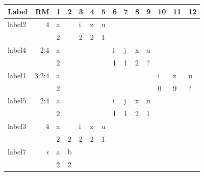 \documentclass{beamer}
\newcommand{\col}[1]{\textcolor{cdpurple}{#1}}
\begin{document}
\begin{frame}
	\begin{tabular}{|p{1cm}|r||R{0.25cm}|R{0.25cm}|R{0.25cm}|R{0.25cm}|R{0.25cm}|R{0.25cm}|R{0.25cm}|R{0.25cm}|R{0.25cm}|R{0.25cm}|R{0.25cm}|R{0.25cm}|}
		\hline
		Label & RM & 1 & 2 & 3 & 4 & 5 & 6 & 7 & 8 & 9 & 10 & 11 & 12 \\ 
		\hline \hline
		label2 & 4          & a &   & i       & z   & u &   &   &   &   &   &   & \\ 
		       &            & 2 &   & 2       & 2   & 1 &   &   &   &   &   &   & \\ \hline
		label4 & 2:4        & a &   &         &     &   & i & j & x & u &   &   & \\ 
		       &            & 2 &   &         &     &   & 1 & 1 & 2 & ? &   &   & \\ \hline
		label1 & 3:2:4      & a &   &         &     &   &   &   &   &   & i & z & u \\ 
		       &            & 2 &   &         &     &   &   &   &   &   & 0 & \col{9} & ? \\ \hline
		label5 & 2:4        & a &   &         &     &   & i & j & x & u &   &   & \\ 
		       &            & 2 &   &         &     &   & 1 & 1 & 2 & 1 &   &   &\\ \hline
		label3 &     4      & a &   & i       & z   & u &   &   &   &   &   &   &   \\ 
		       &            & 2 & 2 & 2       & 2   & 1 &   &   &   &   &   &   &   \\ \hline
		label7 & $\epsilon$ & a & b &         &     &   &   &   &   &   &   &   & \\ 
		       &            & 2 & 2 &         &     &   &   &   &   &   &   &   & \\ \hline
	\end{tabular}
\end{frame}



\end{document}
